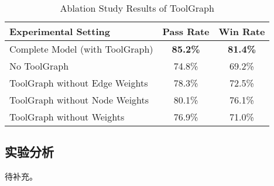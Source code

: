 \begin{table}[h]
  \centering
  \caption{Ablation Study Results of ToolGraph}
  \begin{tabular}{l|c|c}
  \toprule
  \textbf{Experimental Setting}            & \textbf{Pass Rate} & \textbf{Win Rate} \\ \midrule
  Complete Model (with ToolGraph)          & \textbf{85.2\%}    & \textbf{81.4\%}   \\
  No ToolGraph                             & 74.8\%             & 69.2\%            \\
  ToolGraph without Edge Weights           & 78.3\%             & 72.5\%            \\
  ToolGraph without Node Weights           & 80.1\%             & 76.1\%            \\
  ToolGraph without Weights                & 76.9\%             & 71.0\%            \\ 
  \bottomrule
  \end{tabular}
  \label{tab:ablation}
\end{table}

  \subsection{实验分析}

  待补充。

  
      
      
      
